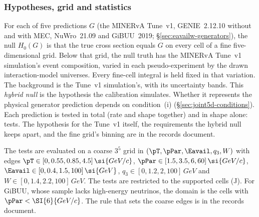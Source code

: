 \subsubsection{Hypotheses, grid and statistics}
\label{sec:joint5d-design}

For each of five predictions $G$ (the MINERvA Tune~v1, GENIE~2.12.10 without and with MEC, NuWro~21.09 and GiBUU~2019; \S\ref{sec:eavailw-generators}), the null $H_{0}(G)$ is that the true cross section equals $G$ on every cell of a fine five-dimensional grid. Below that grid, the null truth has the MINERvA Tune~v1 simulation's event composition, varied in each pseudo-experiment by the drawn interaction-model universes. Every fine-cell integral is held fixed in that variation. The background is the Tune~v1 simulation's, with its uncertainty bands. This \emph{hybrid null} is the hypothesis the calibration simulates. Whether it represents the physical generator prediction depends on condition~(i) (\S\ref{sec:joint5d-conditions}). Each prediction is tested in total (rate and shape together) and in shape alone: \jtNtests{} tests. The hypothesis for the Tune~v1 itself, the requirements the hybrid null keeps apart, and the fine grid's binning are in the records document.

The tests are evaluated on a coarse $3^{5}$ grid in $(\pT,\pPar,\Eavail,q_{3},W)$ with edges $\pT\in[0,0.55,0.85,4.5]\,\si{GeV/c}$, $\pPar\in[1.5,3.5,6,60]\,\si{GeV/c}$, $\Eavail\in[0,0.4,1.5,100]\,\si{GeV}$, $q_{3}\in[0,1.2,2,100]\,\si{GeV}$ and $W\in[0,1.4,2.2,100]\,\si{GeV}$. The tests are restricted to the \jtNcells{} supported cells (J). For GiBUU, whose sample lacks high-energy neutrinos, the domain is the \jtNcellsGiBUU{} cells with $\pPar<\SI{6}{GeV/c}$. The rule that sets the coarse edges is in the records document.

